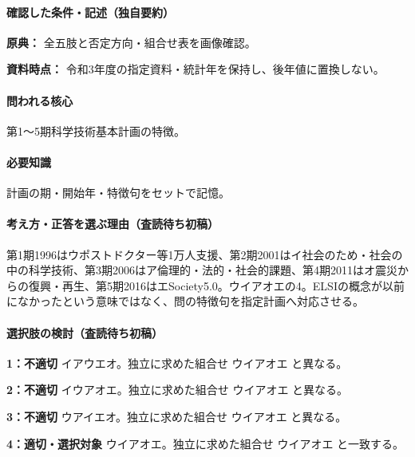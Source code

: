 \paragraph{確認した条件・記述（独自要約）}\mbox{}\par

\noindent\textbf{原典：} 全五肢と否定方向・組合せ表を画像確認。\par

\noindent\textbf{資料時点：} 令和3年度の指定資料・統計年を保持し、後年値に置換しない。\par

\paragraph{問われる核心} 第1〜5期科学技術基本計画の特徴。

\paragraph{必要知識} 計画の期・開始年・特徴句をセットで記憶。

\paragraph{考え方・正答を選ぶ理由（査読待ち初稿）} 第1期1996はウポストドクター等1万人支援、第2期2001はイ社会のため・社会の中の科学技術、第3期2006はア倫理的・法的・社会的課題、第4期2011はオ震災からの復興・再生、第5期2016はエSociety5.0。ウイアオエの4。ELSIの概念が以前になかったという意味ではなく、問の特徴句を指定計画へ対応させる。

\paragraph{選択肢の検討（査読待ち初稿）}\mbox{}\par

\noindent\textbf{1：不適切} イアウエオ。独立に求めた組合せ ウイアオエ と異なる。\par

\noindent\textbf{2：不適切} イウアオエ。独立に求めた組合せ ウイアオエ と異なる。\par

\noindent\textbf{3：不適切} ウアイエオ。独立に求めた組合せ ウイアオエ と異なる。\par

\noindent\textbf{4：適切・選択対象} ウイアオエ。独立に求めた組合せ ウイアオエ と一致する。\par

